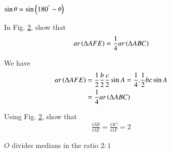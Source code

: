 \begin{figure}[!h]
	\begin{center}
		
		\resizebox{\columnwidth}{!}{}
	\end{center}
	\caption{$\sin \theta = \sin \left(180^{\degree}-\theta\right)$}
	\label{ch2_supp_sin}	
\end{figure}
%
\begin{figure}[!h]
	\begin{center}
		
\begin{problem}
	In Fig. \ref{ch2_median_ratio_val}, show that
	\begin{equation}
	ar\left(\Delta AFE\right) = 	\frac{1}{4} ar\left(\Delta ABC\right)
	\end{equation}
	\label{ch2_small_triang}
\end{problem}
\proof We have
%
\begin{align}
ar\left(\Delta AFE\right) &= \frac{1}{2} \frac{b}{2}\frac{c}{2}\sin A = \frac{1}{4}.\frac{1}{2}bc \sin A \\
&=\frac{1}{4}ar\left(\Delta ABC\right)
\end{align}
%
\begin{problem}
	Using Fig. \ref{ch2_median_ratio_val}, show that
	\begin{align}
	\frac{OB}{OE} = \frac{OC}{OF} = 2
	\end{align}
\end{problem}
		\resizebox{\columnwidth}{!}{}
	\end{center}
	\caption{$O$ divides medians in the ratio $2:1$}
	\label{ch2_median_ratio_val}	
\end{figure}
%


